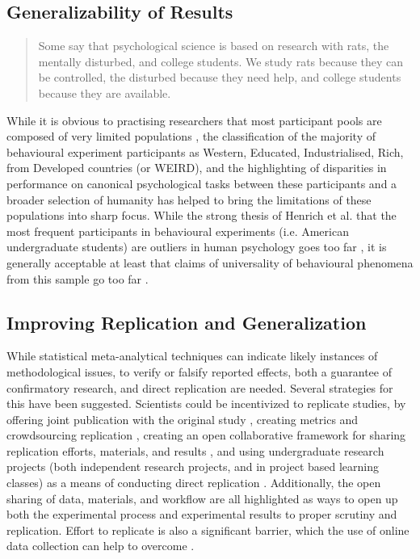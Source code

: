 \documentclass[12pt,a4paper,titlepage]{scrreprt}
\begin{document}
\subsection{Generalizability of Results}
\begin{quote}Some say that psychological science is based on research with rats, the mentally disturbed, and college students. We study rats because they can be controlled, the disturbed because they need help, and college students because they are available. \parencite{birnbaum_psychological_2000}
\end{quote}
While it is obvious to practising researchers that most participant pools are composed of very limited populations \parencite{buchanan_using_1999,birnbaum_psychological_2000,kraut_psychological_2004,birnbaum_human_2004,buhrmester_amazons_2011}, the classification of the majority of behavioural experiment participants as Western, Educated, Industrialised, Rich, from Developed countries (or WEIRD), and the highlighting of disparities in performance on canonical psychological tasks between these participants and a broader selection of humanity  \parencite{henrich_beyond_2010} has helped to bring the limitations of these populations into sharp focus. While the strong thesis of Henrich et al. that the most frequent participants in behavioural experiments (i.e. American undergraduate students) are outliers in human psychology goes too far \parencite{bennis_weirdness_2010}, it is generally acceptable at least that claims of universality of behavioural phenomena from this sample go too far \parencite{baumard_weird_2010,ceci_weird_2010,konecni_responsible_2010}.
\subsection{Improving Replication and Generalization}
While statistical meta-analytical techniques can indicate likely instances of methodological issues, to verify or falsify reported effects, both a guarantee of confirmatory research, and direct replication are needed. Several strategies for this have been suggested. Scientists could be incentivized to replicate studies, by offering joint publication with the original study \parencite{koole_rewarding_2012}, creating metrics and crowdsourcing replication \parencite{nosek_scientific_2012}, creating an open collaborative framework for sharing replication efforts, materials, and results \parencite{collaboration_open_2012}, and using undergraduate research projects (both independent research projects, and in project based learning classes) as a means of conducting direct replication \parencite{grahe_harnessing_2012,frank_teaching_2012}. Additionally, the open sharing of data, materials, and workflow \parencite{giner-sorolla_science_2012,nosek_scientific_2012,miguel_promoting_2014} are all highlighted as ways to open up both the experimental process and experimental results to proper scrutiny and replication. Effort to replicate is also a significant barrier, which the use of online data collection can help to overcome \parencite{grahe_harnessing_2012}.
\end{document}

